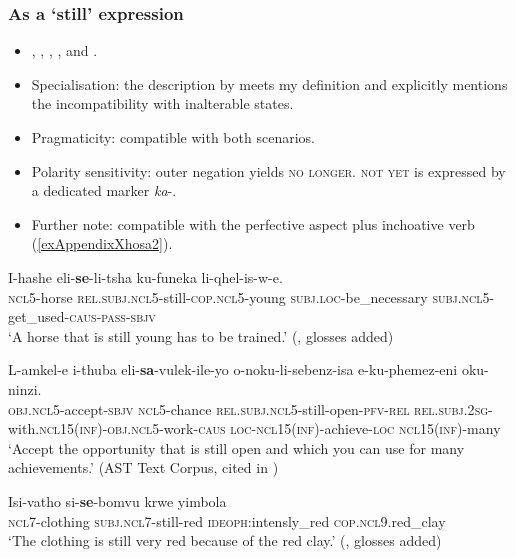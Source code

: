 \subsubsection{As a  \lq still\rq{ }expression}
\begin{itemize}
	\sloppy
	\item \textcite[126–127]{Bennie1939}, \textcite{CranePersohn2021}, \textcite[131–132, 210, 225]{McLaren1936}, \textcite[149]{GreaterDictionaryXhosa}, \textcite[315, 337]{Oosthuysen2016} and \textcite[192–195]{SavicThesis}.
	\item Specialisation:  the description by \citeauthor{CranePersohn2021} meets my definition and explicitly mentions the incompatibility with inalterable states.
	\item Pragmaticity: compatible with both scenarios.
	\item Polarity sensitivity: outer negation yields \textsc{no longer}. \textsc{not yet} is expressed by a dedicated marker \mbox{\textit{ka}-}.
	\item Further note: compatible with the perfective aspect plus inchoative verb (\ref{exAppendixXhosa2}).
\end{itemize}
\begin{exe}
	\ex
	\gll I-hashe eli-\textbf{se}-li-tsha ku-funeka li-qhel-is-w-e.\\
	\textsc{ncl}5-horse \textsc{rel}.\textsc{subj}.\textsc{ncl}5-still-\textsc{cop}.\textsc{ncl}5-young \textsc{subj}.\textsc{loc}-be\_necessary \textsc{subj}.\textsc{ncl}5-get\_used-\textsc{caus}-\textsc{pass}-\textsc{sbjv}\\
	\glt \lq A horse that is still young has to be trained.\rq{ }(\cite[167]{Oosthuysen2016}, glosses added)

	\ex\label{exAppendixXhosa2}
	\gll L-amkel-e i-thuba eli-\textbf{sa}-vulek-ile-yo o-noku-li-sebenz-isa e-ku-phemez-eni oku-ninzi.\\
	\textsc{obj}.\textsc{ncl}5-accept-\textsc{sbjv} \textsc{ncl}5-chance \textsc{rel}.\textsc{subj}.\textsc{ncl}5-still-open-\textsc{pfv}-\textsc{rel} \textsc{rel}.\textsc{subj}.2\textsc{sg}-with.\textsc{ncl}15(\textsc{inf})-\textsc{obj}.\textsc{ncl}5-work-\textsc{caus} \textsc{loc}-\textsc{ncl}15(\textsc{inf})-achieve-\textsc{loc} \textsc{ncl}15(\textsc{inf})-many\\
	\glt \lq Accept the opportunity that is still open and which you can use for many achievements.’ (AST Text Corpus, cited in \cite[243]{CranePersohn2021})

	\ex
	\gll Isi-vatho si-\textbf{se}-bomvu krwe yimbola\\
	\textsc{ncl}7-clothing \textsc{subj}.\textsc{ncl}7-still-red \textsc{ideoph}:intensly\_red \textsc{cop}.\textsc{ncl}9.red\_clay\\
	\glt \lq The clothing is still very red because of the red clay.\rq{ }(\cite[130]{DuPlessisVisser1992}, glosses added)
\end{exe}

